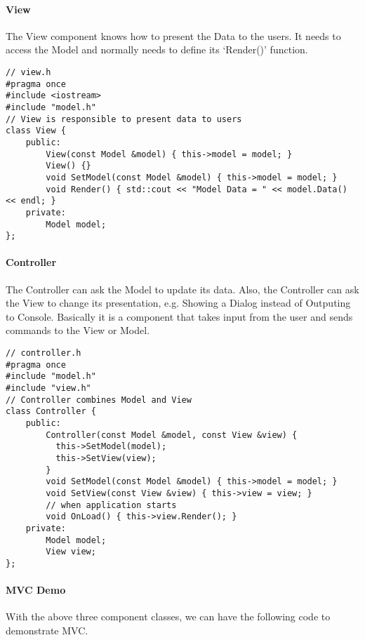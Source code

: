 \documentclass{book}
\begin{document}
\paragraph{View}

The View component knows how to present the Data to the users. It needs to access the Model and normally needs to define its ‘Render()’ function.

\begin{lstlisting}
// view.h
#pragma once
#include <iostream>                  
#include "model.h"                                               
// View is responsible to present data to users
class View {
    public:
        View(const Model &model) { this->model = model; }
        View() {}
        void SetModel(const Model &model) { this->model = model; }
        void Render() { std::cout << "Model Data = " << model.Data() << endl; }
    private:
        Model model;
};
\end{lstlisting}
\paragraph{Controller}

The Controller can ask the Model to update its data.
Also, the Controller can ask the View to change its presentation, e.g. Showing a Dialog instead of Outputing to Console.
Basically it is a component that takes input from the user and sends commands to the View or Model.
	
\begin{lstlisting}
// controller.h
#pragma once
#include "model.h"
#include "view.h"
// Controller combines Model and View
class Controller {
    public:
        Controller(const Model &model, const View &view) {
          this->SetModel(model);
          this->SetView(view);        
        }
        void SetModel(const Model &model) { this->model = model; }
        void SetView(const View &view) { this->view = view; }
        // when application starts
        void OnLoad() { this->view.Render(); }
    private:
        Model model;
        View view;
};
\end{lstlisting}
\paragraph{MVC Demo}

With the above three component classes, we can have the following code to demonstrate MVC.
\end{document}
